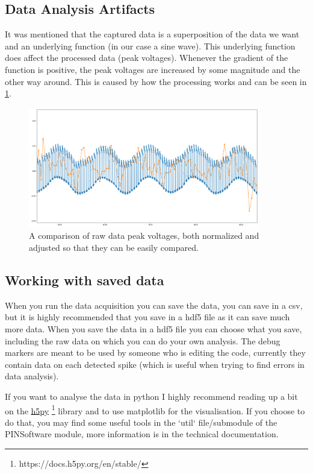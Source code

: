 \documentclass[a4paper, 10pt]{article}
\begin{document}
\subsection{Data Analysis Artifacts}
It was mentioned that the captured data is a superposition of the data we want and an underlying function (in our case a sine wave).
This underlying function does affect the processed data (peak voltages).
Whenever the gradient of the function is positive, the peak voltages are increased by some magnitude and the other way around.
This is caused by how the processing works and can be seen in \cref{fig:soft-ys-pys-corr}.

\begin{figure}[H]
    \centering
    \includegraphics[width=0.9\textwidth]{./images/soft-ys-pys-corr.png}
    \caption{A comparison of raw data peak voltages, both normalized and adjusted so that they can be easily compared.}
    \label{fig:soft-ys-pys-corr}
\end{figure}

\subsection{Working with saved data}
When you run the data acquisition you can save the data, you can save in a csv, but it is highly recommended that you save in a hdf5 file as it can save much more data.
When you save the data in a hdf5 file you can choose what you save, including the raw data on which you can do your own analysis.
The debug markers are meant to be used by someone who is editing the code, currently they contain data on each detected spike (which is useful when trying to find errors in data analysis).

If you want to analyse the data in python I highly recommend reading up a bit on the \href{https://docs.h5py.org/en/stable/}{h5py} \footnote{https://docs.h5py.org/en/stable/} library and to use matplotlib for the visualisation.
If you choose to do that, you may find some useful tools in the `util` file/submodule of the PINSoftware module, more information is in the technical documentation.
\end{document}
